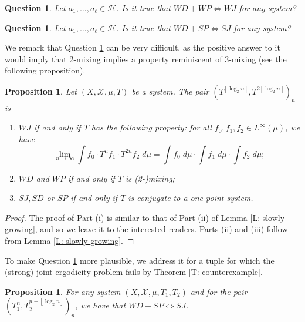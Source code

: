 \documentclass[11pt]{amsart}
\newtheorem{question}[lemma]{Question}
\newtheorem{proposition}[lemma]{Proposition}
\theoremstyle{definition}
\newcommand{\1}{{\mathbf{1}}}
\newcommand{\floor}[1]{{\left \lfloor #1 \right \rfloor}}
\begin{document}
\begin{question}\label{c2} 
    Let $a_{1},\dots,a_{\ell}\in\mathcal{H}$. Is it true that $WD+WP\Leftrightarrow WJ$ for any system?
\end{question}

\begin{question}\label{c3}  
    Let $a_{1},\dots,a_{\ell}\in\mathcal{H}$. Is it true that $WD+SP\Leftrightarrow SJ$ for any system?
\end{question}


We remark that Question \ref{c2} can be very difficult, as the positive answer to it would imply that 2-mixing implies a property reminiscent of 3-mixing (see the following proposition).

\begin{proposition}
     Let $(X,\mathcal{X},\mu,T)$ be a system. The pair $(T^{\floor{\log_{2}n}},T^{2\floor{\log_{2}n}})_{n}$ is 
    \begin{enumerate}
        \item $WJ$ if and only if $T$ has the following property: for all $f_0, f_1, f_2\in L^\infty(\mu)$, we have $$\lim_{n\to\infty}\int f_0\cdot T^n f_1\cdot T^{2n}f_2\; d\mu = \int f_0\; d\mu \cdot \int f_1\; d\mu \cdot \int f_2\; d\mu;$$
        \item $WD$ {and $WP$} if and only if $T$ is (2-)mixing;
        \item $SJ, SD$ or $SP$ if and only if $T$ is conjugate to a one-point system.
    \end{enumerate}
\end{proposition}
\begin{proof}
 The proof of Part (i) is similar to that of Part (ii) of Lemma \ref{L: slowly growing}, and so we leave it to the interested readers.
    Parts (ii) and (iii) follow from Lemma \ref{L: slowly growing}.
\end{proof}

To make Question \ref{c3} more plausible, we address it for a tuple for which the (strong) joint ergodicity problem fails by Theorem \ref{T: counterexample}. 

\begin{proposition}\label{last}
    For any system $(X,\mathcal{X},\mu,T_{1},T_{2})$ and for the pair $(T_{1}^{n},T_{2}^{n+\floor{\log_{2}n}})_{n}$, we have that $WD+SP\Leftrightarrow SJ$.
\end{proposition}
\end{document}

